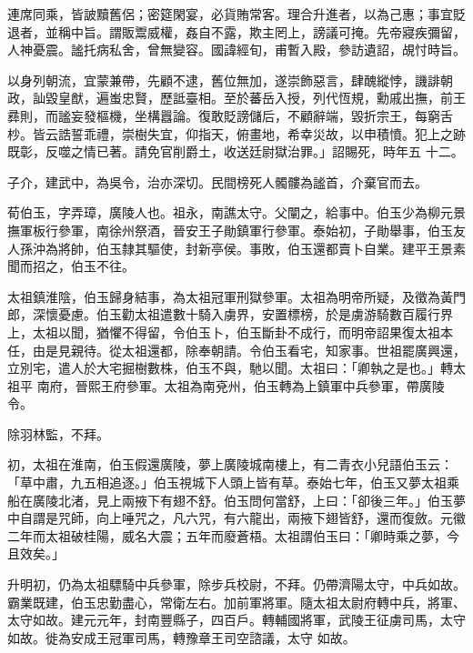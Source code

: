 \begin{pinyinscope}
 連席同乘，皆詖黷舊侶；密筵閑宴，必貨賄常客。理合升進者，以為己惠；事宜貶退者，並稱中旨。謂販鬻威權，姦自不露，欺主罔上，謗議可掩。先帝寢疾彌留，人神憂震。謐托病私舍，曾無變容。國諱經旬，甫暫入殿，參訪遺詔，覘忖時旨。



 以身列朝流，宜蒙兼帶，先顧不逮，舊位無加，遂崇飾惡言，肆醜縱悖，譏誹朝政，訕毀皇猷，遍蚩忠賢，歷詆臺相。至於蕃岳入授，列代恆規，勳戚出撫，前王彞則，而謐妄發樞機，坐構囂論。復敢貶謗儲后，不顧辭端，毀折宗王，每窮舌杪。皆云誥誓乖禮，崇樹失宜，仰指天，俯畫地，希幸災故，以申積憤。犯上之跡既彰，反噬之情已著。請免官削爵土，收送廷尉獄治罪。」詔賜死，時年五
 十二。



 子介，建武中，為吳令，治亦深切。民間榜死人髑髏為謐首，介棄官而去。



 荀伯玉，字弄璋，廣陵人也。祖永，南譙太守。父闡之，給事中。伯玉少為柳元景撫軍板行參軍，南徐州祭酒，晉安王子勛鎮軍行參軍。泰始初，子勛舉事，伯玉友人孫沖為將帥，伯玉隸其驅使，封新亭侯。事敗，伯玉還都賣卜自業。建平王景素聞而招之，伯玉不往。



 太祖鎮淮陰，伯玉歸身結事，為太祖冠軍刑獄參軍。太祖為明帝所疑，及徵為黃門郎，深懷憂慮。伯玉勸太祖遣數十騎入虜界，安置標榜，於是虜游騎數百履行界上，太祖以聞，猶懼不得留，令伯玉卜，伯玉斷卦不成行，而明帝詔果復太祖本任，由是見親待。從太祖還都，除奉朝請。令伯玉看宅，知家事。世祖罷廣興還，立別宅，遣人於大宅掘樹數株，伯玉不與，馳以聞。太祖曰：「卿執之是也。」轉太祖平
 南府，晉熙王府參軍。太祖為南兗州，伯玉轉為上鎮軍中兵參軍，帶廣陵令。



 除羽林監，不拜。



 初，太祖在淮南，伯玉假還廣陵，夢上廣陵城南樓上，有二青衣小兒語伯玉云：「草中肅，九五相追逐。」伯玉視城下人頭上皆有草。泰始七年，伯玉又夢太祖乘船在廣陵北渚，見上兩掖下有翅不舒。伯玉問何當舒，上曰：「卻後三年。」伯玉夢中自謂是咒師，向上唾咒之，凡六咒，有六龍出，兩掖下翅皆舒，還而復斂。元徽二年而太祖破桂陽，威名大震；五年而廢蒼梧。太祖謂伯玉曰：「卿時乘之夢，今且效矣。」



 升明初，仍為太祖驃騎中兵參軍，除步兵校尉，不拜。仍帶濟陽太守，中兵如故。霸業既建，伯玉忠勤盡心，常衛左右。加前軍將軍。隨太祖太尉府轉中兵，將軍、太守如故。建元元年，封南豐縣子，四百戶。轉輔國將軍，武陵王征虜司馬，太守如故。徙為安成王冠軍司馬，轉豫章王司空諮議，太守
 如故。




\end{pinyinscope}
